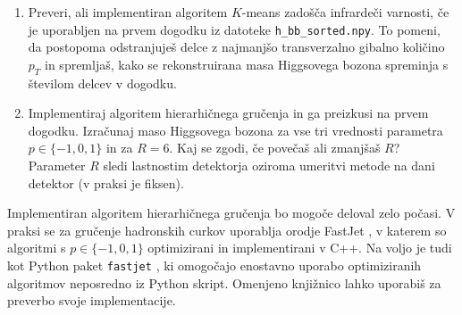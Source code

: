 \documentclass[slovene,11pt,a4paper]{article}
\begin{document}
\begin{enumerate}
    \item[3.] Preveri, ali implementiran algoritem $K$-means zadošča infrardeči varnosti, če je uporabljen na prvem dogodku iz datoteke \texttt{h\_bb\_sorted.npy}. To pomeni, da postopoma odstranjuješ delce z najmanjšo transverzalno gibalno količino $p_T$ in spremljaš, kako se rekonstruirana masa Higgsovega bozona spreminja s številom delcev v dogodku.

    \item[4.] Implementiraj algoritem hierarhičnega gručenja in ga preizkusi na prvem dogodku.  
    Izračunaj maso Higgsovega bozona za vse tri vrednosti parametra $p \in \{-1, 0, 1\}$ in za $R = 6$. Kaj se zgodi, če povečaš ali zmanjšaš $R$? Parameter $R$ sledi lastnostim detektorja oziroma umeritvi metode na dani detektor (v praksi je fiksen).
    
\end{enumerate}

Implementiran algoritem hierarhičnega gručenja bo mogoče deloval zelo počasi. V praksi se za gručenje hadronskih curkov uporablja orodje FastJet \cite{fastjet-Cacciari:2011ma, opti-Cacciari:2005hq}, v katerem so algoritmi s $p \in \{-1, 0, 1\}$ optimizirani in implementirani v C++. Na voljo je tudi kot Python paket \texttt{fastjet} \cite{fastjet-python}, ki omogočajo enostavno uporabo optimiziranih algoritmov neposredno iz Python skript. Omenjeno knjižnico lahko uporabiš za preverbo svoje implementacije.


\end{document}
